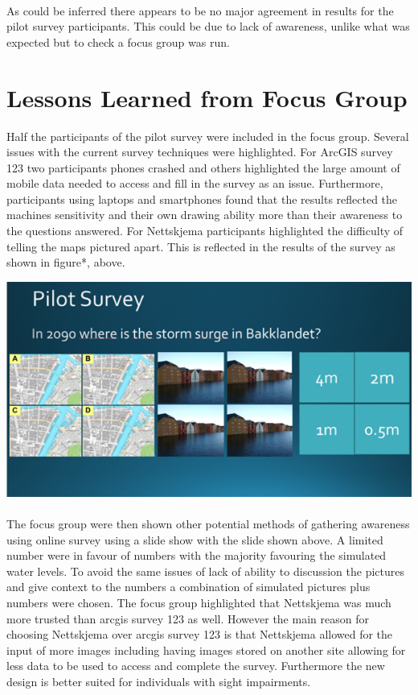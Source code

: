 \paragraph{}

As could be inferred there appears to be no major agreement in results for the pilot survey participants. This could be due to lack of awareness, unlike what was expected but to check a focus group was run. 

\section{Lessons Learned from Focus Group}
Half the participants of the pilot survey were included in the focus group. Several issues with the current survey techniques were highlighted. For ArcGIS survey 123 two participants phones crashed and others highlighted the large amount of mobile data needed to access and fill in the survey as an issue. Furthermore, participants using laptops and smartphones found that the results reflected the machines sensitivity and their own drawing ability more than their awareness to the questions answered. For Nettskjema participants highlighted the difficulty of telling the maps pictured apart. This is reflected in the results of the survey as shown in figure*, above.

\includegraphics[width=1\textwidth]{fig_results/slide shown in focus group.png}

\paragraph{}
The focus group were then shown other potential methods of gathering awareness using online survey using a slide show with the slide shown above. A limited number were in favour of numbers with the majority favouring the simulated water levels. To avoid the same issues of lack of ability to discussion the pictures and give context to the numbers a combination of simulated pictures plus numbers were chosen. 
The focus group highlighted that Nettskjema was much more trusted than arcgis survey 123 as well. However the main reason for choosing Nettskjema over arcgis survey 123 is that Nettskjema allowed for the input of more images including having images stored on another site allowing for less data to be used to access and complete the survey. Furthermore the new design is better suited for individuals with sight impairments.   

